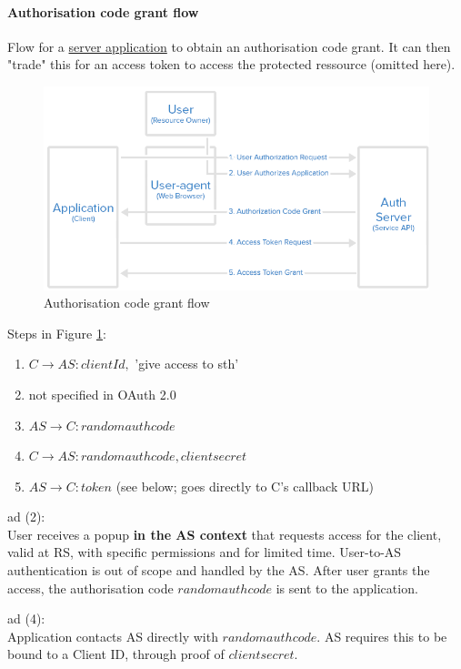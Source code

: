 \paragraph{Authorisation code grant flow} Flow for a \underline{server application} to obtain an authorisation code grant. It can then "trade" this for an access token to access the protected ressource (omitted here).

\begin{figure}[h]
    \centering
    \includegraphics[width=13cm]{images/ch9-oauth-auth-code-flow.png}
    \caption{Authorisation code grant flow}
    \label{fig:oauth-authorisation-code-grant}
\end{figure}

Steps in Figure \ref{fig:oauth-authorisation-code-grant}:
\begin{enumerate}[(1)]
    \item $C \rightarrow AS: clientId,$ 'give access to sth'
    \item not specified in OAuth 2.0
    \item $AS \rightarrow C: randomauthcode$
    \item $C \rightarrow AS: randomauthcode, clientsecret$
    \item $AS \rightarrow C: token$ (see below; goes directly to C’s callback URL)
\end{enumerate}

ad (2):\\
User receives a popup \textbf{in the AS context} that requests access for the client, valid at RS, with specific permissions and for limited time.
User-to-AS authentication is out of scope and handled by the AS.
After user grants the access, the authorisation code $randomauthcode$ is sent to the application.

ad (4):\\
Application contacts AS directly with $randomauthcode$. AS requires this to be bound to a Client ID, through proof of $clientsecret$.

